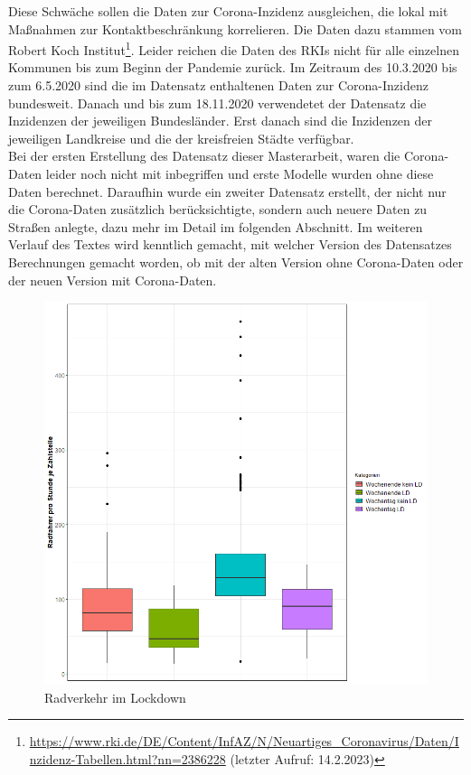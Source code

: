 \documentclass[a4paper,12pt]{thesis}
\begin{document}
Diese Schwäche sollen die Daten zur Corona-Inzidenz ausgleichen, die lokal mit Maßnahmen zur Kontaktbeschränkung korrelieren. Die Daten dazu stammen vom Robert Koch Institut\footnote{\url{https://www.rki.de/DE/Content/InfAZ/N/Neuartiges_Coronavirus/Daten/Inzidenz-Tabellen.html?nn=2386228} (letzter Aufruf: 14.2.2023)}. Leider reichen die Daten des RKIs nicht für alle einzelnen Kommunen bis zum Beginn der Pandemie zurück. Im Zeitraum des 10.3.2020 bis zum 6.5.2020 sind die im Datensatz enthaltenen Daten zur Corona-Inzidenz bundesweit. Danach und bis zum 18.11.2020 verwendetet der Datensatz die Inzidenzen der jeweiligen Bundesländer. Erst danach sind die Inzidenzen der jeweiligen Landkreise und die der kreisfreien Städte verfügbar.\\
Bei der ersten Erstellung des Datensatz dieser Masterarbeit, waren die Corona-Daten leider noch nicht mit inbegriffen und erste Modelle wurden ohne diese Daten berechnet. Daraufhin wurde ein zweiter Datensatz erstellt, der nicht nur die Corona-Daten zusätzlich berücksichtigte, sondern auch neuere Daten zu Straßen anlegte, dazu mehr im Detail im folgenden Abschnitt. Im weiteren Verlauf des Textes wird kenntlich gemacht, mit welcher Version des Datensatzes Berechnungen gemacht worden, ob mit der alten Version ohne Corona-Daten oder der neuen Version mit Corona-Daten.\\

\begin{figure}[!ht]
	\centering
	\includegraphics[width=\textwidth]{Plots/plot63.png}
	\caption{Radverkehr im Lockdown}
	\label{CoronaandBiking}
\end{figure}
\end{document}
